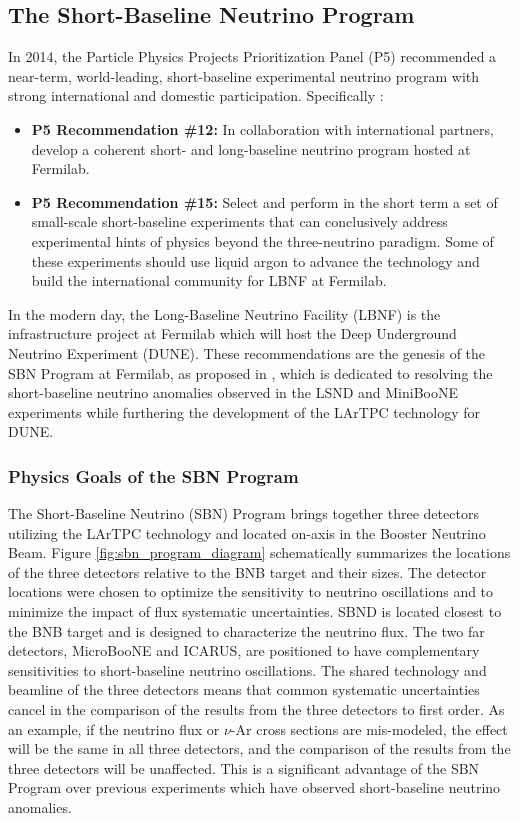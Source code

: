 \subsection{The Short-Baseline Neutrino Program}
\label{sec:sbn_program}
In 2014, the Particle Physics Projects Prioritization Panel (P5) recommended a near-term, world-leading, short-baseline experimental neutrino program with strong international and domestic participation. Specifically \cite{Ritz2014}:

\begin{itemize}
    \item \textbf{P5 Recommendation \#12:} In collaboration with international partners, develop a coherent short- and long-baseline neutrino program hosted at Fermilab.
    \item \textbf{P5 Recommendation \#15:} Select and perform in the short term a set of small-scale short-baseline experiments that can conclusively address experimental hints of physics beyond the three-neutrino paradigm. Some of these experiments should use liquid argon to advance the technology and build the international community for LBNF at Fermilab.
\end{itemize}

In the modern day, the Long-Baseline Neutrino Facility (LBNF) is the infrastructure project at Fermilab which will host the Deep Underground Neutrino Experiment (DUNE). These recommendations are the genesis of the SBN Program at Fermilab, as proposed in \cite{Acciarri2015}, which is dedicated to resolving the short-baseline neutrino anomalies observed in the LSND and MiniBooNE experiments while furthering the development of the LArTPC technology for DUNE.

\subsubsection{Physics Goals of the SBN Program}
\label{sec:sbn_physics}

The Short-Baseline Neutrino (SBN) Program brings together three detectors utilizing the LArTPC technology and located on-axis in the Booster Neutrino Beam. Figure \ref{fig:sbn_program_diagram} schematically summarizes the locations of the three detectors relative to the BNB target and their sizes. The detector locations were chosen to optimize the sensitivity to neutrino oscillations and to minimize the impact of flux systematic uncertainties. SBND is located closest to the BNB target and is designed to characterize the neutrino flux. The two far detectors, MicroBooNE and ICARUS, are positioned to have complementary sensitivities to short-baseline neutrino oscillations. The shared technology and beamline of the three detectors means that common systematic uncertainties cancel in the comparison of the results from the three detectors to first order. As an example, if the neutrino flux or $\nu$-Ar cross sections are mis-modeled, the effect will be the same in all three detectors, and the comparison of the results from the three detectors will be unaffected. This is a significant advantage of the SBN Program over previous experiments which have observed short-baseline neutrino anomalies.

